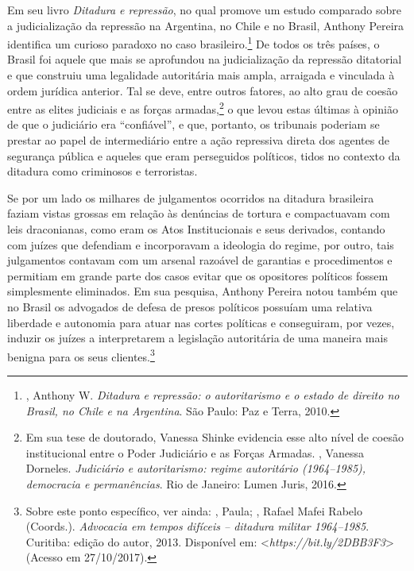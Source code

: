 Em seu livro \emph{Ditadura e repressão}, no qual promove um estudo
comparado sobre a judicialização da repressão na Argentina, no Chile e
no Brasil, Anthony Pereira identifica um curioso paradoxo no caso
brasileiro.\footnote{, Anthony W. \emph{Ditadura e repressão: o
  autoritarismo e o estado de direito no Brasil, no Chile e na
  Argentina}. São Paulo: Paz e Terra, 2010.} De todos os três países, o
Brasil foi aquele que mais se aprofundou na judicialização da repressão
ditatorial e que construiu uma legalidade autoritária mais ampla,
arraigada e vinculada à ordem jurídica anterior. Tal se deve, entre
outros fatores, ao alto grau de coesão entre as elites judiciais e as
forças armadas,\footnote{Em sua tese de doutorado, Vanessa Shinke
  evidencia esse alto nível de coesão institucional entre o Poder
  Judiciário e as Forças Armadas. , Vanessa Dorneles.
  \emph{Judiciário e autoritarismo: regime autoritário (1964--1985),
  democracia e permanências}. Rio de Janeiro: Lumen Juris, 2016.} o que
levou estas últimas à opinião de que o judiciário era ``confiável'', e
que, portanto, os tribunais poderiam se prestar ao papel de intermediário
entre a ação repressiva direta dos agentes de segurança pública e
aqueles que eram perseguidos políticos, tidos no contexto da ditadura
como criminosos e terroristas.

Se por um lado os milhares de julgamentos ocorridos na ditadura
brasileira faziam vistas grossas em relação às denúncias de tortura e
compactuavam com leis draconianas, como eram os Atos Institucionais e
seus derivados, contando com juízes que defendiam e incorporavam a
ideologia do regime, por outro, tais julgamentos contavam com um arsenal
razoável de garantias e procedimentos e permitiam em grande parte dos
casos evitar que os opositores políticos fossem simplesmente eliminados.
Em sua pesquisa, Anthony Pereira notou também que no Brasil os advogados
de defesa de presos políticos possuíam uma relativa liberdade e
autonomia para atuar nas cortes políticas e conseguiram, por vezes,
induzir os juízes a interpretarem a legislação autoritária de uma
maneira mais benigna para os seus clientes.\footnote{Sobre este ponto
  específico, ver ainda: , Paula; , Rafael Mafei Rabelo
  (Coords.). \emph{Advocacia em tempos difíceis -- ditadura militar
  1964--1985}. Curitiba: edição do autor, 2013. Disponível em:
 \textless{}\emph{https://bit.ly/2DBB3F3}\textgreater{}
  (Acesso em 27/10/2017).}

